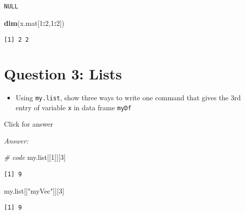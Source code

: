 \documentclass[
]{book}
\newenvironment{Shaded}{\begin{snugshade}}{\end{snugshade}}
\newcommand{\CommentTok}[1]{\textcolor[rgb]{0.56,0.35,0.01}{\textit{#1}}}
\newcommand{\DecValTok}[1]{\textcolor[rgb]{0.00,0.00,0.81}{#1}}
\newcommand{\FunctionTok}[1]{\textcolor[rgb]{0.13,0.29,0.53}{\textbf{#1}}}
\newcommand{\NormalTok}[1]{#1}
\newcommand{\SpecialCharTok}[1]{\textcolor[rgb]{0.81,0.36,0.00}{\textbf{#1}}}
\newcommand{\StringTok}[1]{\textcolor[rgb]{0.31,0.60,0.02}{#1}}
\providecommand{\tightlist}{%
  \setlength{\itemsep}{0pt}\setlength{\parskip}{0pt}}
\begin{document}
\begin{verbatim}
NULL
\end{verbatim}

\begin{Shaded}
\begin{Highlighting}[]
\FunctionTok{dim}\NormalTok{(x.mat[}\DecValTok{1}\SpecialCharTok{:}\DecValTok{2}\NormalTok{,}\DecValTok{1}\SpecialCharTok{:}\DecValTok{2}\NormalTok{])}
\end{Highlighting}
\end{Shaded}

\begin{verbatim}
[1] 2 2
\end{verbatim}

\hypertarget{question-3-lists}{%
\section{Question 3: Lists}\label{question-3-lists}}

\begin{itemize}
\tightlist
\item
  Using \texttt{my.list}, show three ways to write one command that gives the 3rd entry of variable \texttt{x} in data frame \texttt{myDf}
\end{itemize}

Click for answer

\emph{Answer:}

\begin{Shaded}
\begin{Highlighting}[]
\CommentTok{\# code}
\NormalTok{my.list[[}\DecValTok{1}\NormalTok{]][}\DecValTok{3}\NormalTok{]}
\end{Highlighting}
\end{Shaded}

\begin{verbatim}
[1] 9
\end{verbatim}

\begin{Shaded}
\begin{Highlighting}[]
\NormalTok{my.list[[}\StringTok{"myVec"}\NormalTok{]][}\DecValTok{3}\NormalTok{]}
\end{Highlighting}
\end{Shaded}

\begin{verbatim}
[1] 9
\end{verbatim}

\begin{Shaded}
\end{Shaded}
\end{document}
